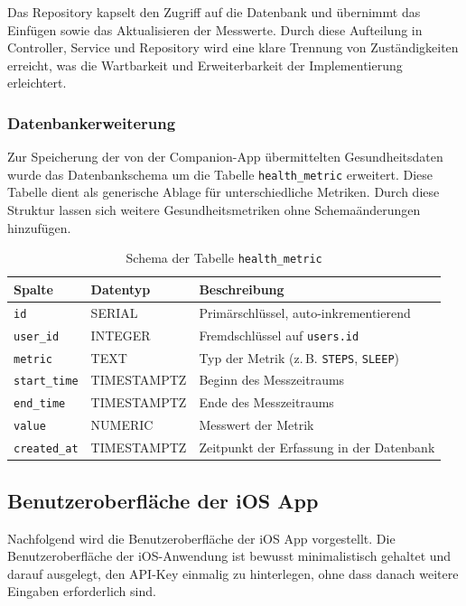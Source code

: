 \documentclass[12pt,a4paper]{report}
\begin{document}
Das Repository kapselt den Zugriff auf die Datenbank und übernimmt das Einfügen sowie das Aktualisieren der Messwerte. Durch diese
Aufteilung in Controller, Service und Repository wird eine klare Trennung von Zuständigkeiten erreicht, was die Wartbarkeit und
Erweiterbarkeit der Implementierung erleichtert.

\subsubsection{Datenbankerweiterung}

Zur Speicherung der von der Companion-App übermittelten Gesundheitsdaten wurde das Datenbankschema um die Tabelle 
\texttt{health\_metric} erweitert. Diese Tabelle dient als generische Ablage für unterschiedliche Metriken. Durch diese Struktur
lassen sich weitere Gesundheitsmetriken ohne Schemaänderungen hinzufügen.  

\begin{table}[H]
\centering
\begin{tabular}{|l|l|p{9cm}|}
\hline
\textbf{Spalte} & \textbf{Datentyp} & \textbf{Beschreibung} \\
\hline
\texttt{id} & SERIAL & Primärschlüssel, auto-inkrementierend \\
\texttt{user\_id} & INTEGER & Fremdschlüssel auf \texttt{users.id} \\
\texttt{metric} & TEXT & Typ der Metrik (z.\,B. \texttt{STEPS}, \texttt{SLEEP}) \\
\texttt{start\_time} & TIMESTAMPTZ & Beginn des Messzeitraums \\
\texttt{end\_time} & TIMESTAMPTZ & Ende des Messzeitraums \\
\texttt{value} & NUMERIC & Messwert der Metrik \\
\texttt{created\_at} & TIMESTAMPTZ & Zeitpunkt der Erfassung in der Datenbank \\
\hline
\end{tabular}
\caption{Schema der Tabelle \texttt{health\_metric}}
\label{tab:health_metric_schema}
\end{table}

\subsection{Benutzeroberfläche der iOS App}

Nachfolgend wird die Benutzeroberfläche der iOS App vorgestellt. Die Benutzeroberfläche der iOS-Anwendung ist bewusst
minimalistisch gehaltet und darauf ausgelegt, den API-Key einmalig zu hinterlegen, ohne dass danach weitere Eingaben erforderlich
sind.
\end{document}
